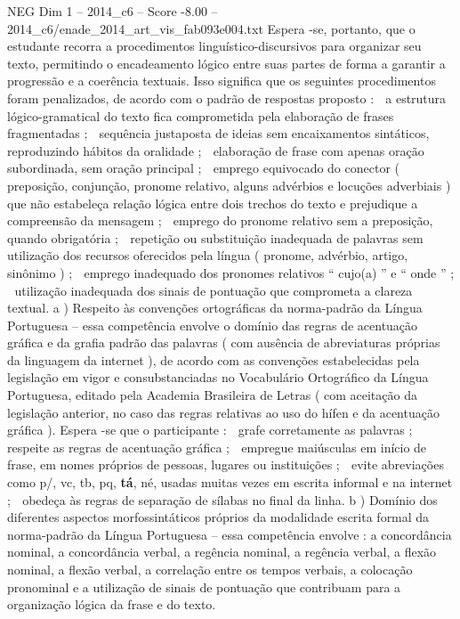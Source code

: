 \begin{textsample}{NEG Dim 1 – 2014\_c6 – Score -8.00 – 2014\_c6/enade\_2014\_art\_vis\_fab093e004.txt}
Espera -se, portanto, que o estudante recorra a procedimentos linguístico-discursivos para organizar seu texto, permitindo o encadeamento lógico entre suas partes de forma a garantir a progressão e a coerência textuais.
Isso significa que os seguintes procedimentos foram penalizados, de acordo com o padrão de respostas proposto :  a estrutura lógico-gramatical do texto fica comprometida pela elaboração de frases fragmentadas ;  sequência justaposta de ideias sem encaixamentos sintáticos, reproduzindo hábitos da oralidade ;  elaboração de frase com apenas oração subordinada, sem oração principal ;  emprego equivocado do conector ( preposição, conjunção, pronome relativo, alguns advérbios e locuções adverbiais ) que não estabeleça relação lógica entre dois trechos do texto e prejudique a compreensão da mensagem ;  emprego do pronome relativo sem a preposição, quando obrigatória ;  repetição ou substituição inadequada de palavras sem utilização dos recursos oferecidos pela língua ( pronome, advérbio, artigo, sinônimo ) ;  emprego inadequado dos pronomes relativos “ cujo(a) ” e “ onde ” ;  utilização inadequada dos sinais de pontuação que comprometa a clareza textual. a ) Respeito às convenções ortográficas da norma-padrão da Língua Portuguesa – essa competência envolve o domínio das regras de acentuação gráfica e da grafia padrão das palavras ( com ausência de abreviaturas próprias da linguagem da internet ), de acordo com as convenções estabelecidas pela legislação em vigor e consubstanciadas no Vocabulário Ortográfico da Língua Portuguesa, editado pela Academia Brasileira de Letras ( com aceitação da legislação anterior, no caso das regras relativas ao uso do hífen e da acentuação gráfica ).
Espera -se que o participante :  grafe corretamente as palavras ;  respeite as regras de acentuação gráfica ;  empregue maiúsculas em início de frase, em nomes próprios de pessoas, lugares ou instituições ;  evite abreviações como p/, vc, tb, pq, \textbf{tá}, né, usadas muitas vezes em escrita informal e na internet ;  obedeça às regras de separação de sílabas no final da linha. b ) Domínio dos diferentes aspectos morfossintáticos próprios da modalidade escrita formal da norma-padrão da Língua Portuguesa – essa competência envolve : a concordância nominal, a concordância verbal, a regência nominal, a regência verbal, a flexão nominal, a flexão verbal, a correlação entre os tempos verbais, a colocação pronominal e a utilização de sinais de pontuação que contribuam para a organização lógica da frase e do texto.

\end{textsample}
